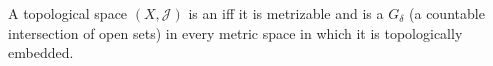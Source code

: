 A topological space $(X, \mathcal{J})$ is an  iff it is metrizable and is a $G_{\delta}$ (a countable intersection of open sets) in every metric space in which it is topologically embedded.
